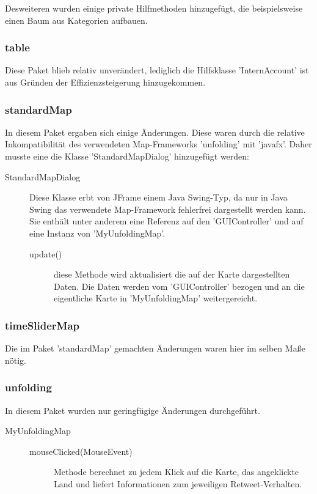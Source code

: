 		Desweiteren wurden einige private Hilfmethoden hinzugefügt, die beispielsweise einen Baum aus Kategorien aufbauen.
		
		\subsubsection{table}
		
		Diese Paket blieb relativ unverändert, lediglich die Hilfsklasse 'InternAccount' ist aus Gründen der Effizienzsteigerung hinzugekommen.
		
		\subsubsection{standardMap}
		
		In diesem Paket ergaben sich einige Änderungen. Diese waren durch die relative Inkompatibilität des verwendeten Map-Frameworks 'unfolding' mit 'javafx'. Daher musste eine die Klasse 'StandardMapDialog' hinzugefügt werden:
		\begin{description}
			\item[StandardMapDialog] \quad Diese Klasse erbt von JFrame einem Java Swing-Typ, da nur in Java Swing das verwendete Map-Framework fehlerfrei dargestellt werden kann. Sie enthält unter anderem eine Referenz auf den 'GUIController' und auf eine Instanz von 'MyUnfoldingMap'.
			\begin{description}
				\item[update()] diese Methode wird aktualisiert die auf der Karte dargestellten Daten. Die Daten werden vom 'GUIController' bezogen und an die eigentliche Karte in 'MyUnfoldingMap' weitergereicht.
			\end{description}
		\end{description}
		
		\subsubsection{timeSliderMap}
		Die im Paket 'standardMap' gemachten Änderungen waren hier im selben Maße nötig.
		\subsubsection{unfolding} 
		In diesem Paket wurden nur geringfügige Änderungen durchgeführt.
		\begin{description}
			\item[MyUnfoldingMap]
				\begin{description}
					\item[mouseClicked(MouseEvent)] Methode berechnet zu jedem Klick auf die Karte, das angeklickte Land und liefert Informationen zum jeweiligen Retweet-Verhalten.
				\end{description}
		\end{description}
	